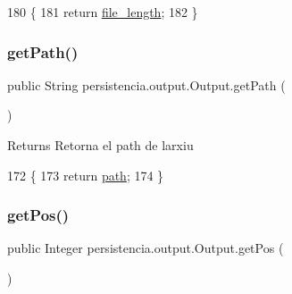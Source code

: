 \begin{DoxyCode}
180                             \{
181         \textcolor{keywordflow}{return} \hyperlink{classpersistencia_1_1output_1_1Output_a028761929614fdc2b88f9ebe0e2313ef}{file\_length};
182     \}
\end{DoxyCode}
\mbox{\label{classpersistencia_1_1output_1_1Output_ae33fc52334f791b6d4d7aebf2931df8d}} 
\subsubsection{\texorpdfstring{get\+Path()}{getPath()}}
{\footnotesize\ttfamily public String persistencia.\+output.\+Output.\+get\+Path (\begin{DoxyParamCaption}{ }\end{DoxyParamCaption})\hspace{0.3cm}{\ttfamily [inline]}}

\begin{DoxyReturn}{Returns}
Retorna el path de l\textquotesingle{}arxiu 
\end{DoxyReturn}

\begin{DoxyCode}
172                             \{
173         \textcolor{keywordflow}{return} \hyperlink{classpersistencia_1_1output_1_1Output_aebef717882f3bcc7080dec014c6714c9}{path};
174     \}
\end{DoxyCode}
\mbox{\label{classpersistencia_1_1output_1_1Output_a01f862217e01efb59bc2eff3fe54006f}} 
\subsubsection{\texorpdfstring{get\+Pos()}{getPos()}}
{\footnotesize\ttfamily public Integer persistencia.\+output.\+Output.\+get\+Pos (\begin{DoxyParamCaption}{ }\end{DoxyParamCaption})\hspace{0.3cm}{\ttfamily [inline]}}

